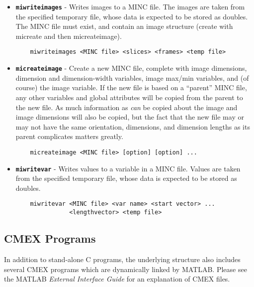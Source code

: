 \documentclass[11pt]{article}
\def\code#1{{\tt \bf #1}}
\begin{document}
\begin {itemize}

\item \code{miwriteimages} - Writes images to a MINC file.  The
images are taken from the specified temporary file, whose data is
expected to be stored as doubles.  The MINC file must exist, and
contain an image structure (create with micreate and then
micreateimage).
\begin{verbatim}
    miwriteimages <MINC file> <slices> <frames> <temp file>
\end{verbatim}

\item \code{micreateimage} - Create a new MINC file, complete with
image dimensions, dimension and dimension-width variables, image
max/min variables, and (of course) the image variable.  If the new
file is based on a ``parent'' MINC file, any other variables and
global attributes will be copied from the parent to the new file.  As
much information as {\em can} be copied about the image and image
dimensions will also be copied, but the fact that the new file may or
may not have the same orientation, dimensions, and dimension lengths
as its parent complicates matters greatly.
\begin{verbatim}
    micreateimage <MINC file> [option] [option] ...
\end{verbatim}

\item \code{miwritevar} - Writes values to a variable in a MINC file.  
Values are taken from the specified temporary file, whose data is
expected to be stored as doubles.
\begin{verbatim}
    miwritevar <MINC file> <var name> <start vector> ...
               <lengthvector> <temp file>
\end{verbatim}

\end{itemize}


\subsection{CMEX Programs}

In addition to stand-alone C programs, the underlying structure also includes
several CMEX programs which are dynamically linked by MATLAB.  Please see the
MATLAB {\em External Interface Guide} for an explanation of CMEX files.
\end{document}
